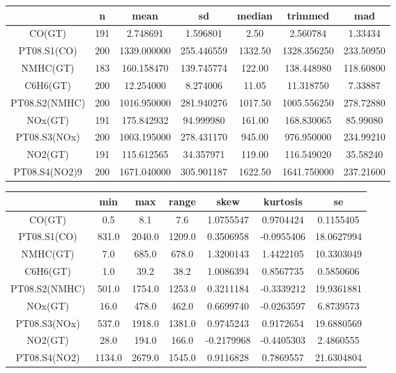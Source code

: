 \begin{table}[H]
  \centering
  \begin{tabular}{|c|c|c|c|c|c|c|}
    \hline
      & n & mean & sd & median & trimmed & mad\\
    \hline
    CO(GT) & 191 & 2.748691 & 1.596801 & 2.50 & 2.560784 & 1.33434\\
    \hline
    PT08.S1(CO) & 200 & 1339.000000 & 255.446559 & 1332.50 & 1328.356250 & 233.50950\\
    \hline
    NMHC(GT) & 183 & 160.158470 & 139.745774 & 122.00 & 138.448980 & 118.60800\\
    \hline
    C6H6(GT) & 200 & 12.254000 & 8.274006 & 11.05 & 11.318750 & 7.33887\\
    \hline
    PT08.S2(NMHC) & 200 & 1016.950000 & 281.940276 & 1017.50 & 1005.556250 & 278.72880\\
    \hline
    NOx(GT) & 191 & 175.842932 & 94.999980 & 161.00 & 168.830065 & 85.99080\\
    \hline
    PT08.S3(NOx) & 200 & 1003.195000 & 278.431170 & 945.00 & 976.950000 & 234.99210\\
    \hline
    NO2(GT) & 191 & 115.612565 & 34.357971 & 119.00 & 116.549020 & 35.58240\\
    \hline
    PT08.S4(NO2)9 & 200 & 1671.040000 & 305.901187 & 1622.50 & 1641.750000 & 237.21600\\
    \hline
  \end{tabular}
\end{table}

\begin{table}[H]
  \centering
  \begin{tabular}{|c|c|c|c|c|c|c|}
    \hline
      & min & max & range & skew & kurtosis & se\\
    \hline
    CO(GT) & 0.5 & 8.1 & 7.6 & 1.0755547 & 0.9704424 & 0.1155405\\
    \hline
    PT08.S1(CO) & 831.0 & 2040.0 & 1209.0 & 0.3506958 & -0.0955406 & 18.0627994\\
    \hline
    NMHC(GT) & 7.0 & 685.0 & 678.0 & 1.3200143 & 1.4422105 & 10.3303049\\
    \hline
    C6H6(GT) & 1.0 & 39.2 & 38.2 & 1.0086394 & 0.8567735 & 0.5850606\\
    \hline
    PT08.S2(NMHC) & 501.0 & 1754.0 & 1253.0 & 0.3211184 & -0.3339212 & 19.9361881\\
    \hline
    NOx(GT) & 16.0 & 478.0 & 462.0 & 0.6699740 & -0.0263597 & 6.8739573\\
    \hline
    PT08.S3(NOx) & 537.0 & 1918.0 & 1381.0 & 0.9745243 & 0.9172654 & 19.6880569\\
    \hline
    NO2(GT) & 28.0 & 194.0 & 166.0 & -0.2179968 & -0.4405303 & 2.4860555\\
    \hline
    PT08.S4(NO2) & 1134.0 & 2679.0 & 1545.0 & 0.9116828 & 0.7869557 & 21.6304804\\
    \hline
  \end{tabular}
\end{table}


